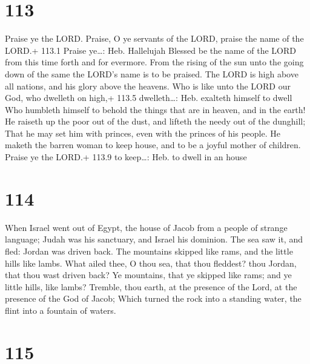 \hypertarget{section-112}{%
\section{113}\label{section-112}}

 Praise ye the LORD. Praise, O ye servants of the LORD,
praise the name of the LORD.+ 113.1 Praise ye\ldots: Heb. Hallelujah
 Blessed be the name of the LORD from this time forth and
for evermore.  From the rising of the sun unto the going
down of the same the LORD's name is to be praised.  The LORD
is high above all nations, and his glory above the heavens. 
Who is like unto the LORD our God, who dwelleth on high,+ 113.5
dwelleth\ldots: Heb. exalteth himself to dwell  Who humbleth
himself to behold the things that are in heaven, and in the earth!
 He raiseth up the poor out of the dust, and lifteth the
needy out of the dunghill;  That he may set him with
princes, even with the princes of his people.  He maketh the
barren woman to keep house, and to be a joyful mother of children.
Praise ye the LORD.+ 113.9 to keep\ldots: Heb. to dwell in an house

\hypertarget{section-113}{%
\section{114}\label{section-113}}

 When Israel went out of Egypt, the house of Jacob from a
people of strange language;  Judah was his sanctuary, and
Israel his dominion.  The sea saw it, and fled: Jordan was
driven back.  The mountains skipped like rams, and the
little hills like lambs.  What ailed thee, O thou sea, that
thou fleddest? thou Jordan, that thou wast driven back?  Ye
mountains, that ye skipped like rams; and ye little hills, like lambs?
 Tremble, thou earth, at the presence of the Lord, at the
presence of the God of Jacob;  Which turned the rock into a
standing water, the flint into a fountain of waters.

\hypertarget{section-114}{%
\section{115}\label{section-114}}

